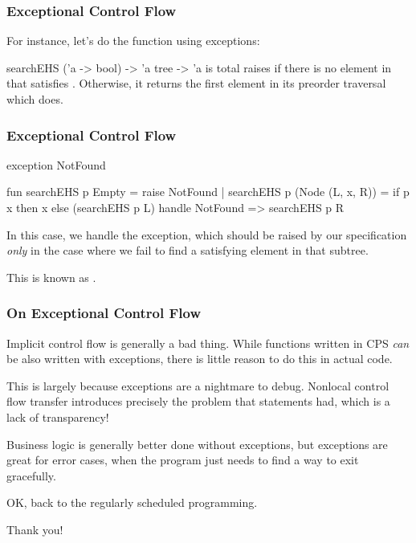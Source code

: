 \documentclass[aspectratio=169]{beamer}
\begin{document}
\begin{frame}[fragile]
  \frametitle{Exceptional Control Flow}
  
  For instance, let's do the  function using exceptions:

  \spec
    {searchEHS}
    {('a -> bool) -> 'a tree -> 'a}
    { is total}
    { raises  if there is no element in
     that satisfies . Otherwise, it returns the first element
    in its preorder traversal which does.}
\end{frame}

\begin{frame}[fragile]
  \frametitle{Exceptional Control Flow}
  \begin{codeblock}
    exception NotFound 
    
    fun searchEHS p Empty = raise NotFound 
      | searchEHS p (Node (L, x, R)) = 
          if p x then
            x
          else
            (searchEHS p L) handle NotFound => searchEHS p R 
  \end{codeblock}

  In this case, we handle the  exception, which should be raised
  by our specification \textit{only} in the case where we fail to find a 
  satisfying element in that subtree.

  \vspace{\fill}

  This is known as .
\end{frame}

\begin{frame}[fragile]
  \frametitle{On Exceptional Control Flow}

  Implicit control flow is generally a bad thing. While functions written in
  CPS \textit{can} be also written with exceptions, there is little reason to
  do this in actual code.

  \vspace{\fill}

  This is largely because exceptions are a nightmare to debug. Nonlocal control
  flow transfer introduces precisely the problem that  statements 
  had, which is a lack of transparency!

  \vspace{\fill}

  Business logic is generally better done without exceptions, but exceptions are
  great for error cases, when the program just needs to find a way to exit
  gracefully.

  \vspace{\fill}

  OK, back to the regularly scheduled programming.
\end{frame}

\begin{frame}[plain]
	\begin{center} Thank you! \end{center}
\end{frame}
\end{document}

